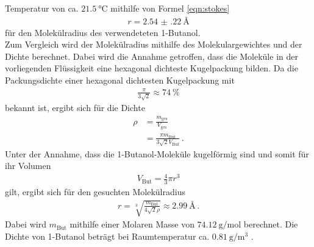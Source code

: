 Temperatur von ca. $\SI{21.5}{\degreeCelsius}$
mithilfe von Formel \eqref{eqn:stokes}
\begin{align}
  r = \SI{2.54(22)}{\angstrom}
  \label{eqn:radius1}
\end{align}
für den Molekülradius des verwendeteten 1-Butanol. \\
Zum Vergleich wird der Molekülradius mithilfe des Molekulargewichtes und der Dichte berechnet. Dabei wird die Annahme getroffen,
dass die Moleküle in der vorliegenden Flüssigkeit eine hexagonal dichteste Kugelpackung bilden.
Da die Packungsdichte einer hexagonal dichtesten Kugelpackung mit
\begin{align*}
  \frac{\pi}{3\sqrt{2}} \approx \SI{74}{\percent}
\end{align*}
bekannt ist, ergibt sich für die Dichte
\begin{align*}
  \rho &= \frac{m_\text{ges}}{V_\text{ges}} \\
       &= \frac{\pi m_\text{But}}{3\sqrt{2}V_\text{But}}\,.
\end{align*}
Unter der Annahme, dass die 1-Butanol-Moleküle kugelförmig sind und somit für ihr Volumen
\begin{align*}
  V_\text{But} = \frac{4}{3} \pi r^3
\end{align*}
gilt, ergibt sich für den gesuchten Molekülradius
\begin{align}
  r = \sqrt[3]{\frac{m_\text{But}}{4\sqrt{2}\rho}} \approx \SI{2.99}{\angstrom}\, .
  \label{eqn:radius2}
\end{align}
Dabei wird $m_\text{But}$ mithilfe einer Molaren Masse von $\SI{74.12}{\gram\per\mole}$ berechnet.
Die Dichte von 1-Butanol beträgt bei Raumtemperatur ca. $\SI{0.81}{\gram\per\cubic\meter}$ \cite{dichte}.
